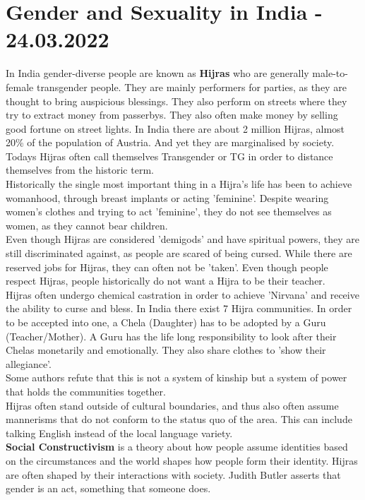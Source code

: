 \documentclass{article}
\begin{document}
	\section{Gender and Sexuality in India - 24.03.2022}
	In India gender-diverse people are known as \textbf{Hijras} who are generally male-to-female transgender people. They are mainly performers for parties, as they are thought to bring auspicious blessings. They also perform on streets where they try to extract money from passerbys. They also often make money by selling good fortune on street lights. In India there are about 2 million Hijras, almost 20\% of the population of Austria. And yet they are marginalised by society. Todays Hijras often call themselves Transgender or TG in order to distance themselves from the historic term. \\
	Historically the single most important thing in a Hijra's life has been to achieve womanhood, through breast implants or acting 'feminine'. Despite wearing women's clothes and trying to act 'feminine', they do not see themselves as women, as they cannot bear children. \\
	Even though Hijras are considered 'demigods' and have spiritual powers, they are still discriminated against, as people are scared of being cursed. While there are reserved jobs for Hijras, they can often not be 'taken'. Even though people respect Hijras, people historically do not want a Hijra to be their teacher. \\
	Hijras often undergo chemical castration in order to achieve 'Nirvana' and receive the ability to curse and bless. In India there exist 7 Hijra communities. In order to be accepted into one, a Chela (Daughter) has to be adopted by a Guru (Teacher/Mother). A Guru has the life long responsibility to look after their Chelas monetarily and emotionally. They also share clothes to 'show their allegiance'. \\
	Some authors refute that this is not a system of kinship but a system of power that holds the communities together. \\
	Hijras often stand outside of cultural boundaries, and thus also often assume mannerisms that do not conform to the status quo of the area. This can include talking English instead of the local language variety. \\
	\textbf{Social Constructivism} is a theory about how people assume identities based on the circumstances and the world shapes how people form their identity. Hijras are often shaped by their interactions with society. Judith Butler asserts that gender is an act, something that someone does. \\
\end{document}
